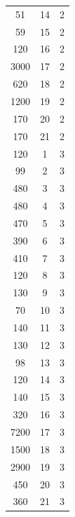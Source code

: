 \documentclass[a4paper,12pt]{article}
\begin{document}
\begin{center}
\begin{longtable}{c|c|c}
			51  & 14 & 2  \\
			59  & 15 & 2  \\
			120 & 16 & 2  \\
			3000& 17 & 2  \\
			620 & 18 & 2  \\
			1200& 19 & 2  \\
			170 & 20 & 2  \\
			170 & 21 & 2  \\
			120 & 1  & 3  \\
			99  & 2  & 3  \\
			480 & 3  & 3  \\
			480 & 4  & 3  \\
			470 & 5  & 3  \\
			390 & 6  & 3  \\
			410 & 7  & 3  \\
			120 & 8  & 3  \\
			130 & 9  & 3  \\
			70  & 10 & 3  \\
			140 & 11 & 3  \\
			130 & 12 & 3  \\
			98  & 13 & 3  \\
			120 & 14 & 3  \\
			140 & 15 & 3  \\
			320 & 16 & 3  \\
			7200& 17 & 3  \\
			1500& 18 & 3  \\
			2900& 19 & 3  \\
			450 & 20 & 3  \\
			360 & 21 & 3  \\
			\end{longtable}
		\end{center}
\end{document}
